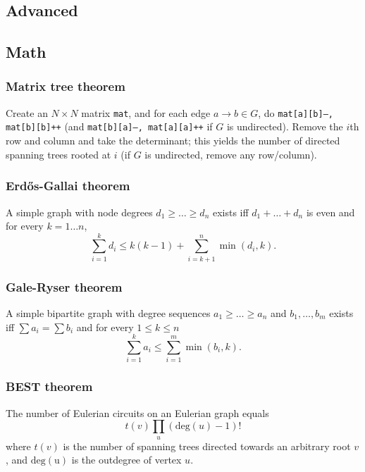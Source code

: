 \subsection{Advanced}

\subsection{Math}
  \subsubsection{Matrix tree theorem}
    Create an $N\times N$ matrix \texttt{mat}, and for each edge $a \rightarrow b \in G$, do
    \texttt{mat[a][b]--, mat[b][b]++} (and \texttt{mat[b][a]--, mat[a][a]++} if $G$ is undirected).
    Remove the $i$th row and column and take the determinant; this yields the number of directed spanning trees rooted at $i$
    (if $G$ is undirected, remove any row/column).

  \subsubsection{Erdős-Gallai theorem}
    A simple graph with node degrees $d_1 \ge \dots \ge d_n$ exists iff $d_1 + \dots + d_n$ is even and for every $k = 1\dots n$,
    \[ \sum _{i=1}^{k}d_{i}\leq k(k-1)+\sum _{i=k+1}^{n}\min(d_{i},k). \]

  \subsubsection{Gale-Ryser theorem}
    A simple bipartite graph with degree sequences $a_1 \geq \dots \geq a_n$
    and $b_1, \dots, b_m$ exists iff $\sum a_i = \sum b_i$ and for every
    $1 \leq k \leq n$
    \[ \sum_{i=1}^k a_i \leq \sum_{i=1}^m \min(b_i, k). \]

  \subsubsection{BEST theorem}
    The number of Eulerian circuits on an Eulerian graph equals
    \[ t(v) \prod_{u} (\mathrm{deg}(u) - 1)! \]
    where $t(v)$ is the number of spanning trees directed towards an arbitrary root $v$,
    and $\mathrm{deg(u)}$ is the outdegree of vertex $u$.
